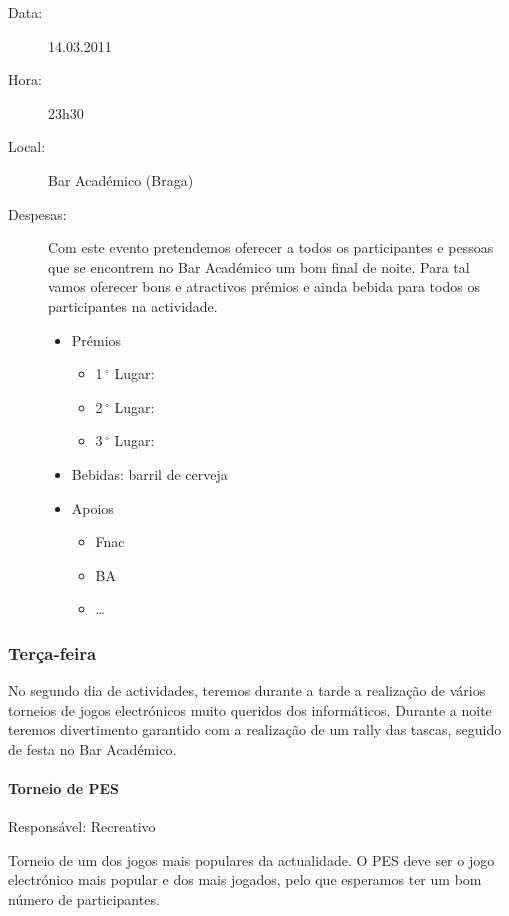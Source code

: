 \begin{description}
	\item[Data:] 14.03.2011
	\item[Hora:] 23h30
	\item[Local:] Bar Académico (Braga)
	\item[Despesas:] Com este evento pretendemos oferecer a todos os participantes e pessoas que se encontrem no Bar Académico um bom final de noite. Para tal vamos oferecer bons e atractivos prémios e ainda bebida para todos os participantes na actividade.
	\begin{itemize}
		\item Prémios
		\begin{itemize}
			\item 1$\,^{\circ}$ Lugar:
			\item 2$\,^{\circ}$ Lugar:
			\item 3$\,^{\circ}$ Lugar:
		\end{itemize}
		\item Bebidas: barril de cerveja
		\item Apoios
		\begin{itemize}
			\item Fnac
			\item BA
			\item \dots  
		\end{itemize}
	\end{itemize}
\end{description}


\subsubsection*{Terça-feira}
No segundo dia de actividades, teremos durante a tarde a realização de vários torneios de jogos electrónicos muito queridos dos informáticos. Durante a noite teremos divertimento garantido com a realização de um rally das tascas, seguido de festa no Bar Académico.


\paragraph{Torneio de PES}
Responsável: Recreativo

Torneio de um dos jogos mais populares da actualidade. O PES deve ser o jogo electrónico mais popular e dos mais jogados, pelo que esperamos ter um bom número de participantes.

